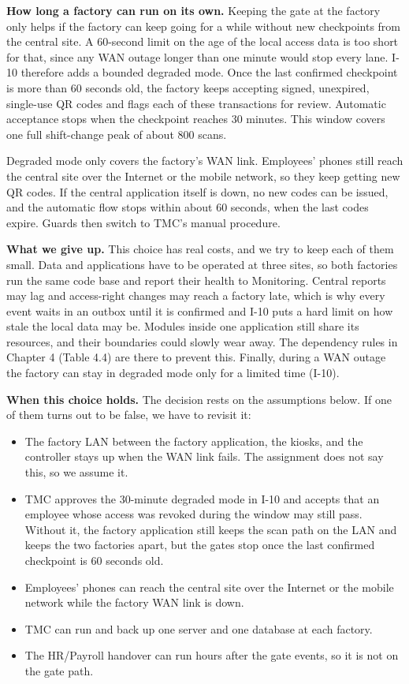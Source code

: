 \textbf{How long a factory can run on its own.} Keeping the gate at the factory only helps if the factory can keep going for a while without new checkpoints from the central site. A 60-second limit on the age of the local access data is too short for that, since any WAN outage longer than one minute would stop every lane. I-10 therefore adds a bounded degraded mode. Once the last confirmed checkpoint is more than 60 seconds old, the factory keeps accepting signed, unexpired, single-use QR codes and flags each of these transactions for review. Automatic acceptance stops when the checkpoint reaches 30 minutes. This window covers one full shift-change peak of about 800 scans.

Degraded mode only covers the factory's WAN link. Employees' phones still reach the central site over the Internet or the mobile network, so they keep getting new QR codes. If the central application itself is down, no new codes can be issued, and the automatic flow stops within about 60 seconds, when the last codes expire. Guards then switch to TMC's manual procedure.

\textbf{What we give up.} This choice has real costs, and we try to keep each of them small. Data and applications have to be operated at three sites, so both factories run the same code base and report their health to Monitoring. Central reports may lag and access-right changes may reach a factory late, which is why every event waits in an outbox until it is confirmed and I-10 puts a hard limit on how stale the local data may be. Modules inside one application still share its resources, and their boundaries could slowly wear away. The dependency rules in Chapter 4 (Table 4.4) are there to prevent this. Finally, during a WAN outage the factory can stay in degraded mode only for a limited time (I-10).

\textbf{When this choice holds.} The decision rests on the assumptions below. If one of them turns out to be false, we have to revisit it:

\begin{itemize}[leftmargin=36pt, itemsep=2pt, topsep=4pt, parsep=2pt]
  \item The factory LAN between the factory application, the kiosks, and the controller stays up when the WAN link fails. The assignment does not say this, so we assume it.
  \item TMC approves the 30-minute degraded mode in I-10 and accepts that an employee whose access was revoked during the window may still pass. Without it, the factory application still keeps the scan path on the LAN and keeps the two factories apart, but the gates stop once the last confirmed checkpoint is 60 seconds old.
  \item Employees' phones can reach the central site over the Internet or the mobile network while the factory WAN link is down.
  \item TMC can run and back up one server and one database at each factory.
  \item The HR/Payroll handover can run hours after the gate events, so it is not on the gate path.
\end{itemize}


